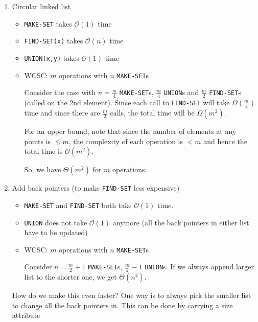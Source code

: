 \documentclass[11pt]{article}
\begin{document}
\begin{enumerate}
    \item Circular linked list 
    \begin{itemize}
        \item \texttt{MAKE-SET} takes $\mathcal{O}(1)$ time
        
        \item \texttt{FIND-SET(x)} takes $\mathcal{O}(n)$ time 
        
        \item \texttt{UNION(x,y)} takes $\mathcal{O}(1)$ time
        
        \item WCSC: $m$ operations with $n$ \texttt{MAKE-SET}s 
        
        Consider the case with $n = \frac{m}{4}$ \texttt{MAKE-SET}s, $\frac{m}{4}$ \texttt{UNION}s and $\frac{m}{2}$ \texttt{FIND-SET}s (called on the 2nd element). Since each call to \texttt{FIND-SET} will take $\Omega(\frac{m}{4})$ time and since there are $\frac{m}{2}$ calls, the total time will be $\Omega(m^2)$. 
        
        For an upper bound, note that since the number of elements at any points is $\leq m$, the complexity of each operation is $< m$ and hence the total time is $\mathcal{O}(m^2)$. 
        
        So, we have $\Theta(m^2)$ for $m$ operations. 
    \end{itemize}
    
    \item Add back pointers (to make \texttt{FIND-SET} less expensive) 
    \begin{itemize}
        \item \texttt{MAKE-SET} and \texttt{FIND-SET} both take $\mathcal{O}(1)$ time. 
        
        \item \texttt{UNION} does not take $\mathcal{O}(1)$ anymore (all the back pointers in either list have to be updated) 
        
        \item WCSC: $m$ operations with $n$ \texttt{MAKE-SET}s 
        
        Consider $n = \frac{m}{2} + 1$ \texttt{MAKE-SET}s, $\frac{m}{2} - 1$ \texttt{UNION}s. If we always append larger list to the shorter one, we get $\Theta(n^2)$. 
    \end{itemize}
    How do we make this even faster? One way is to always pick the smaller list to change all the back pointers in. This can be done by carrying a size attribute
    

\end{enumerate}
\end{document}
